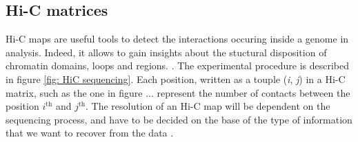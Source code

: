 \subsection{Hi-C matrices} \label{chap: Hi-C matrices}

Hi-C maps are useful tools to detect the interactions occuring inside a genome in analysis. Indeed, it allows to gain insights about the stuctural disposition of chromatin domains, loops and regions.
\cite{lajoieHitchhikerGuideHiC2015}.
The experimental procedure is described in figure \ref{fig: HiC sequencing}. Each position, written as a touple (\textit{i}, \textit{j})  in a Hi-C matrix, such as the one in figure ... %
represent the number of contacts between the position $i^{\text{th}}$ and $j^{\text{th}}$. The resolution of an Hi-C map will be dependent on the sequencing process, and have to be decided on the base of the type of information that we want to recover from the data
\cite{lajoieHitchhikerGuideHiC2015}.


